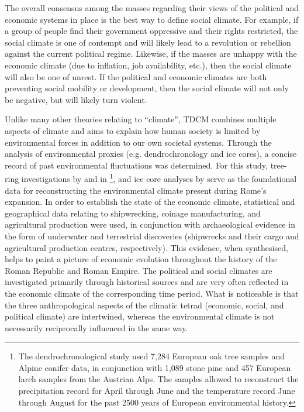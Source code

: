 The overall consensus among the masses regarding their views of the political and economic systems in place is the best way to define social climate. For example, if a group of people find their government oppressive and their rights restricted, the social climate is one of contempt and will likely lead to a revolution or rebellion against the current political regime. Likewise, if the masses are unhappy with the economic climate (due to inflation, job availability, etc.), then the social climate will also be one of unrest. If the political and economic climates are both preventing social mobility or development, then the social climate will not only be negative, but will likely turn violent.

Unlike many other theories relating to “climate”, TDCM combines multiple aspects of climate and aims to explain how human society is limited by environmental forces in addition to our own societal systems. Through the analysis of environmental proxies (e.g. dendrochronology and ice cores), a concise record of past environmental fluctuations was determined. For this study, tree-ring investigations by \textcite{Büntgen_2011a} and in \textcite{Büntgen_2011b}\footnote{The dendrochronological study used 7,284 European oak tree samples and Alpine conifer data, in conjunction with 1,089 stone pine and 457 European larch samples from the Austrian Alps. The samples allowed \textcite{Büntgen_2011a} to reconstruct the precipitation record for April through June and the temperature record June through August for the past 2500 years of European environmental history.}, and ice core analyses by \textcite{McCormick_2012} serve as the foundational data for reconstructing the environmental climate present during Rome’s expansion. In order to establish the state of the economic climate, statistical and geographical data relating to shipwrecking, coinage manufacturing, and agricultural production were used, in conjunction with archaeological evidence in the form of underwater and terrestrial discoveries (shipwrecks and their cargo and agricultural production centres, respectively). This evidence, when synthesised, helps to paint a picture of economic evolution throughout the history of the Roman Republic and Roman Empire. The political and social climates are investigated primarily through historical sources and are very often reflected in the economic climate of the corresponding time period. What is noticeable is that the three anthropological aspects of the climatic tetrad (economic, social, and political climate) are intertwined, whereas the environmental climate is not necessarily reciprocally influenced in the same way.

